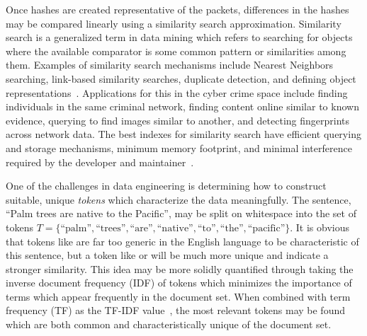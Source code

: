 Once hashes are created representative of the packets, differences in the hashes may be compared linearly using a similarity search approximation. Similarity search is a generalized term in data mining which refers to searching for objects where the available comparator is some common pattern or similarities among them. Examples of similarity search mechanisms include Nearest Neighbors searching, link-based similarity searches, duplicate detection, and defining object representations~\cite{lshforest}. Applications for this in the cyber crime space include finding individuals in the same criminal network, finding content online similar to known evidence, querying to find images similar to another, and detecting fingerprints across network data. The best indexes for similarity search have efficient querying and storage mechanisms, minimum memory footprint, and minimal interference required by the developer and maintainer~\cite{simsearch}.

One of the challenges in data engineering is determining how to construct suitable, unique \textit{tokens} which characterize the data meaningfully. The sentence, ``Palm trees are native to the Pacific'', may be split on whitespace into the set of tokens $T = \{\text{``palm''}, \text{``trees''}, \text{``are''}, \text{``native''}, \text{``to''}, \text{``the''}, \text{``pacific''}\}$. It is obvious that tokens like  are far too generic in the English language to be characteristic of this sentence, but a token like  or  will be much more unique and indicate a stronger similarity. This idea may be more solidly quantified through taking the inverse document frequency (IDF) of tokens which minimizes the importance of terms which appear frequently in the document set. When combined with term frequency (TF) as the TF-IDF value~\cite{tf-idf}, the most relevant tokens may be found which are both common and characteristically unique of the document set.
